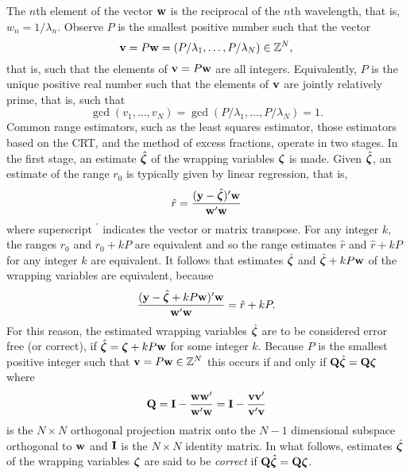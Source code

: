 The $n$th element of the vector $\mathbf{w}$ is the reciprocal of the $n$th wavelength, that is, $w_n = 1/\lambda_n$.  Observe $P$ is the smallest positive number such that the vector 
\[
\mathbf{v} = P\mathbf{w} = (P/\lambda_1, \dots, P/\lambda_N) \in {\mathbb Z}^N,
\]
that is, such that the elements of $\mathbf{v} = P\mathbf{w}$ are all integers. Equivalently, $P$ is the unique positive real number such that the elements of $\mathbf{v}$ are jointly relatively prime, that is, such that 
\[
\gcd(v_1,\dots,v_N) = \gcd(P/\lambda_1, \dots, P/\lambda_N) = 1.
\]
Common range estimators, such as the least squares estimator, those estimators based on the CRT, and the method of excess fractions, operate in two stages. In the first stage, an estimate $\hat{\boldsymbol{\zeta}}$ of the wrapping variables $\boldsymbol{\zeta}$ is made. Given $\hat{\boldsymbol{\zeta}}$, an estimate of the range $r_0$ is typically given by linear regression, that is, 
\begin{equation}\label{ch4:eq:rhatlinreg}
\hat{r}  = \frac{(\mathbf{y} - \hat{\boldsymbol{\zeta}})^\prime\mathbf{w}}{\mathbf{w}^\prime\mathbf{w}}
\end{equation}
where superscript $^\prime$ indicates the vector or matrix transpose. For any integer $k$, the ranges $r_0$ and $r_0 + kP$ are equivalent and so the range estimates $\hat{r}$ and $\hat{r} + kP$ for any integer $k$ are equivalent.  %
It follows that estimates $\hat{\boldsymbol{\zeta}}$ and $\hat{\boldsymbol{\zeta}} + kP\mathbf{w}$ of the wrapping variables are equivalent, because
\[
\frac{(\mathbf{y} - \hat{\boldsymbol{\zeta}} + kP\mathbf{w})^\prime\mathbf{w}}{\mathbf{w}^\prime\mathbf{w}} = \hat{r} + kP.
\]
For this reason, the estimated wrapping variables $\hat{\boldsymbol{\zeta}}$ are to be considered error free (or correct), if $\hat{\boldsymbol{\zeta}} = \boldsymbol{\zeta} + kP\mathbf{w}$ for some integer $k$.  Because $P$ is the smallest positive integer such that $\mathbf{v} = P\mathbf{w} \in {\mathbb Z}^N$ this occurs if and only if $\mathbf{Q} \hat{\boldsymbol{\zeta}} = \mathbf{Q} \boldsymbol{\zeta}$ where 
\begin{equation}\label{eq:Qproj}
\mathbf{Q} = \mathbf{I} - \frac{\mathbf{w}\mathbf{w}^\prime}{\mathbf{w}^\prime\mathbf{w}} = \mathbf{I} - \frac{\mathbf{v}\mathbf{v}^\prime}{\mathbf{v}^\prime\mathbf{v}}
\end{equation}
is the $N \times N$ orthogonal projection matrix onto the $N-1$ dimensional subspace orthogonal to $\mathbf{w}$ and $\mathbf{I}$ is the $N\times N$ identity matrix.  In what follows, estimates $\hat{\boldsymbol{\zeta}}$ of the wrapping variables $\boldsymbol{\zeta}$ are said to be \emph{correct} if $\mathbf{Q} \hat{\boldsymbol{\zeta}} = \mathbf{Q} \boldsymbol{\zeta}$.


